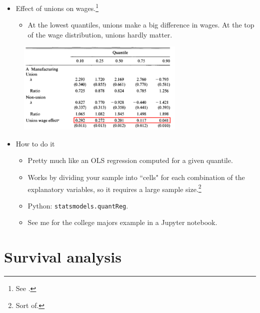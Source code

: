 \documentclass{beamer}
\begin{document}
\begin{frame}
	\begin{itemize}
		\item Effect of unions on wages.\footnote{See \cite{chamberlain1994quantile}.}
		\begin{itemize}
			\item At the lowest quantiles, unions make a big difference in wages. At the top of the wage distribution, unions hardly matter. 
		\end{itemize}
	\end{itemize}
	\begin{figure}
		\includegraphics[width=8cm]{chamberlain-unions.png}
		\centering
	\end{figure}
\end{frame} 

\begin{frame}
	\begin{itemize}
		\item How to do it
		\begin{itemize}
			\item Pretty much like an OLS regression computed for a given quantile.
			\item Works by dividing your sample into ``cells" for each combination of the explanatory variables, so it requires a large sample size.\footnote{Sort of.}
			\item Python: \texttt{statsmodels.quantReg}.
			\item See me for the college majors example in a Jupyter notebook.
		\end{itemize}
	\end{itemize}
\end{frame}

\section{Survival analysis}
\end{document}
